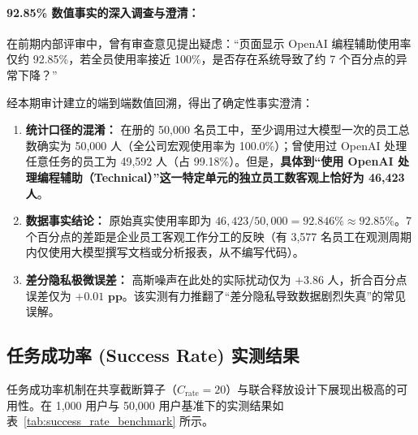 \paragraph{92.85\% 数值事实的深入调查与澄清：}
在前期内部评审中，曾有审查意见提出疑虑：“页面显示 OpenAI 编程辅助使用率仅约 92.85\%，若全员使用率接近 100\%，是否存在系统导致了约 7 个百分点的异常下降？”

经本期审计建立的端到端数值回溯，得出了确定性事实澄清：
\begin{enumerate}[label=(\arabic*), leftmargin=2em]
  \item \textbf{统计口径的混淆：} 在册的 50,000 名员工中，至少调用过大模型一次的员工总数确实为 50,000 人（全公司宏观使用率为 100.0\%）；曾使用过 OpenAI 处理任意任务的员工为 49,592 人（占 99.18\%）。但是，\textbf{具体到“使用 OpenAI 处理编程辅助（Technical）”这一特定单元的独立员工数客观上恰好为 46,423 人}。
  \item \textbf{数据事实结论：} 原始真实使用率即为 $46,423 / 50,000 = \mathbf{92.846\% \approx 92.85\%}$。7 个百分点的差距是企业员工客观工作分工的反映（有 3,577 名员工在观测周期内仅使用大模型撰写文档或分析报表，从不编写代码）。
  \item \textbf{差分隐私极微误差：} 高斯噪声在此处的实际扰动仅为 $+3.86$ 人，折合百分点误差仅为 $\mathbf{+0.01\text{ pp}}$。该实测有力推翻了“差分隐私导致数据剧烈失真”的常见误解。
\end{enumerate}

\subsection{任务成功率 (Success Rate) 实测结果}
任务成功率机制在共享截断算子（$C_{\text{rate}} = 20$）与联合释放设计下展现出极高的可用性。在 1,000 用户与 50,000 用户基准下的实测结果如表~\ref{tab:success_rate_benchmark} 所示。

\begin{table}[htbp]
\centering
\small
\caption{任务成功率 (Success Rate) 实测精度对比表 ($\varepsilon=1.0, \delta=10^{-6}$)}
\label{tab:success_rate_benchmark}
\end{table}


